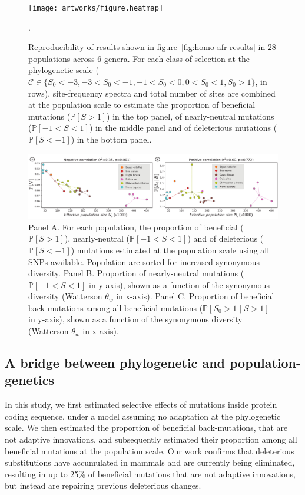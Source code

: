\documentclass{article}
\newcommand{\proba}{\mathbb{P}}
\newcommand{\Sphy}{S_{0}}
\newcommand{\Sphyclass}{\mathcal{C}}
\newcommand{\divStrongDel}{\Sphy < -3}
\newcommand{\divDel}{-3 < \Sphy < -1}
\newcommand{\divWeakDel}{-1 < \Sphy < 0}
\newcommand{\divWeakAdv}{0 < \Sphy < 1}
\newcommand{\divAdv}{ \Sphy > 1}
\newcommand{\given}{\mid}
\newcommand{\Spop}{S}
\newcommand{\polyDel}{\Spop < -1}
\newcommand{\polyNeutral}{-1 < \Spop < 1}
\newcommand{\polyAdv}{ \Spop > 1}
\newcommand{\PpolyDel}{\proba \left[ \polyDel \right]}
\newcommand{\PpolyNeutral}{\proba \left[ \polyNeutral \right]}
\newcommand{\PpolyAdv}{\proba \left[ \polyAdv \right]}
\begin{document}
    \begin{figure}[!ht]
        \centering
        \texttt{[image: artworks/figure.heatmap]}
        \caption{
            Reproducibility of results shown in figure~\ref{fig:homo-afr-results} in 28 populations across 6 genera.
            For each class of selection at the phylogenetic scale ($\Sphyclass \in \{ \divStrongDel, \divDel,  \divWeakDel,  \divWeakAdv, \divAdv \}$, in rows), site-frequency spectra and total number of sites are combined at the population scale to estimate the proportion of beneficial mutations ($\PpolyAdv$) in the top panel, of nearly-neutral mutations ($\PpolyNeutral$) in the middle panel and of deleterious mutations ($\PpolyDel$) in the bottom panel.
        }.
        \label{fig:heatmap}
    \end{figure}

    \begin{figure}[!ht]
        \centering
        \includegraphics[width=\textwidth, page=1] {artworks/figure.diversity}
        \caption{
            Panel A. For each population, the proportion of beneficial ($\PpolyAdv$), nearly-neutral ($\PpolyNeutral$) and of deleterious ($\PpolyDel$) mutations estimated at the population scale using all SNPs available.
            Population are sorted for increased synonymous diversity.
            Panel B. Proportion of nearly-neutral mutations ($\mathbb{P} [ -1 < \Spop < 1]$ in y-axis), shown as a function of the synonymous diversity (Watterson $\theta_w$ in x-axis).
            Panel C. Proportion of beneficial back-mutations among all beneficial mutations ($\mathbb{P} [ \Sphy > 1  \given  \Spop > 1]$ in y-axis), shown as a function of the synonymous diversity (Watterson $\theta_w$ in x-axis).
        }
        \label{fig:diversity}
    \end{figure}

    \subsection*{A bridge between phylogenetic and population-genetics}
    In this study, we first estimated selective effects of mutations inside protein coding sequence, under a model assuming no adaptation at the phylogenetic scale.
    We then estimated the proportion of beneficial back-mutations, that are not adaptive innovations, and subsequently estimated their proportion among all beneficial mutations at the population scale.
    Our work confirms that deleterious substitutions have accumulated in mammals and are currently being eliminated, resulting in up to 25\% of beneficial mutations that are not adaptive innovations, but instead are repairing previous deleterious changes.
\end{document}
